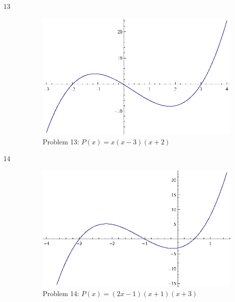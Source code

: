\documentclass{exam}
\begin{document}
\begin{description}
    \item[13]
      \begin{figure}[H]
        \centering
        \includegraphics[scale=0.9]{problem13.eps}
        \caption*{Problem 13: $P(x) = x(x - 3)(x + 2)$}
      \end{figure}

    \item[14]
      \begin{figure}[H]
        \centering
        \includegraphics[scale=0.9]{problem14.eps}
        \caption*{Problem 14: $P(x) = (2x - 1)(x + 1)(x + 3)$}
      \end{figure}


\end{description}
\end{document}
